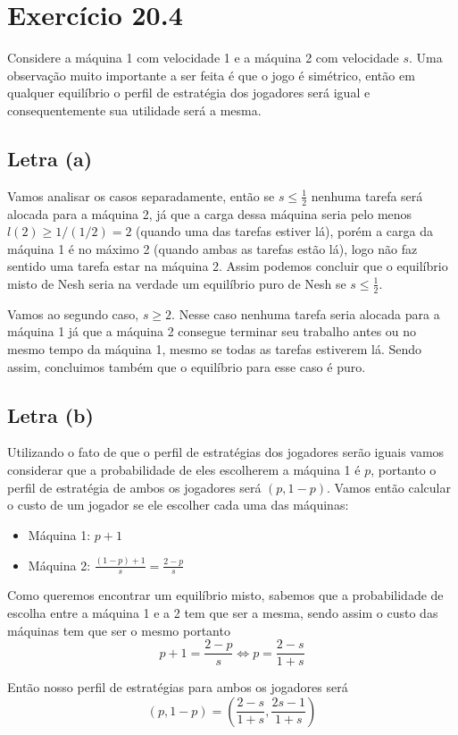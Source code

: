 \documentclass[12pt, letterpaper]{article}
\begin{document}
\section{Exercício 20.4}
	Considere a máquina 1 com velocidade 1 e a máquina 2 com velocidade $s$. Uma observação muito importante a ser feita é que o jogo é simétrico, então em qualquer equilíbrio o perfil de estratégia dos jogadores será igual e consequentemente sua utilidade será a mesma.
	\subsection{Letra (a)}
		Vamos analisar os casos separadamente, então se $s \leq \frac{1}{2}$ nenhuma tarefa será alocada para a máquina 2, já que a carga dessa máquina seria pelo menos $l(2) \geq 1/(1 / 2) = 2$ (quando uma das tarefas estiver lá), porém a carga da máquina 1 é no máximo 2 (quando ambas as tarefas estão lá), logo não faz sentido uma tarefa estar na máquina 2. Assim podemos concluir que o equilíbrio misto de Nesh seria na verdade um equilíbrio puro de Nesh se $s \leq \frac{1}{2}$.

		Vamos ao segundo caso, $s \geq 2$. Nesse caso nenhuma tarefa seria alocada para a máquina 1 já que a máquina 2 consegue terminar seu trabalho antes ou no mesmo tempo da máquina 1, mesmo se todas as tarefas estiverem lá. Sendo assim, concluimos também que o equilíbrio para esse caso é puro.
	\subsection{Letra (b)}
		Utilizando o fato de que o perfil de estratégias dos jogadores serão iguais vamos considerar que a probabilidade de eles escolherem a máquina 1 é $p$, portanto o perfil de estratégia de ambos os jogadores será $(p, 1 - p)$. Vamos então calcular o custo de um jogador se ele escolher cada uma das máquinas:
		\begin{itemize}
			\item{Máquina 1: $p + 1$}
			\item{Máquina 2: $\frac{(1 - p) + 1}{s} = \frac{2 - p}{s}$}
		\end{itemize}

		Como queremos encontrar um equilíbrio misto, sabemos que a probabilidade de escolha entre a máquina 1 e a 2 tem que ser a mesma, sendo assim o custo das máquinas tem que ser o mesmo portanto
		$$
			p + 1 = \frac{2 - p}{s} \Leftrightarrow p = \frac{2 - s}{1 + s}
		$$

		Então nosso perfil de estratégias para ambos os jogadores será
		$$
			(p, 1 - p) = \left(\frac{2 - s}{1 + s}, \frac{2s - 1}{1 + s} \right)
		$$
\end{document}
